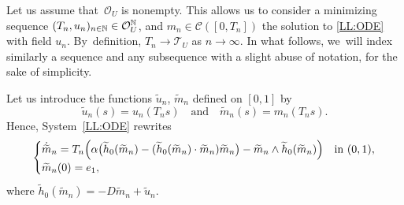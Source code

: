 \documentclass[JEP,XML,SOM,Unicode,NoEqCountersInSection,NoFloatCountersInSection,published]{cedram}
\theoremstyle{definition}
\newcommand{\N} {\mathbb{N}}
\begin{document}

Let us assume that~$\mathcal{O}_{U }$ is nonempty. This allows us to consider a minimizing \hbox{sequence} $(T_n,u_n)_{n\in\N}\in\nobreak \mathcal{O}_{U }^\N$, and $m_n \in \mathscr{C}([0,T_n])$ the solution to \eqref{LL:ODE} with field $u_n$.
By~definition, $T_n \to \mathcal{T}_U$ as $n \to \infty$.
In what follows, we~will index similarly a sequence and any subsequence with a slight abuse of notation, for the sake of simplicity.

Let us introduce the functions $\widetilde{u}_n$, $\widetilde{m}_{n}$ defined on $[0,1]$ by
\[
\widetilde{u}_n(s)=u_n(T_ns)\quad \text{and}\quad \widetilde{m}_{n}(s)=m_{n}(T_ns).
\]
Hence, System~\eqref{LL:ODE} rewrites
\begin{equation}\label{LL:ODEbis}
\begin{cases}
\dot{\widetilde{m}}_n = T_n \Bigl(\alpha \bigl(\widetilde{h}_0(\widetilde{m}_n)-(\widetilde{h}_0(\widetilde{m}_n)\cdot \widetilde{m}_n) \widetilde{m}_n\bigr)-\widetilde{m}_n\wedge \widetilde{h}_0(\widetilde{m}_n)\Bigr)& \text{in }(0,1), \\
\widetilde{m}_n(0) =e_1,
\end{cases}
\end{equation}
where $\widetilde{h}_0(\widetilde{m}_n)=-D\widetilde{m}_{n}+\widetilde{u}_n$.
\end{document}
